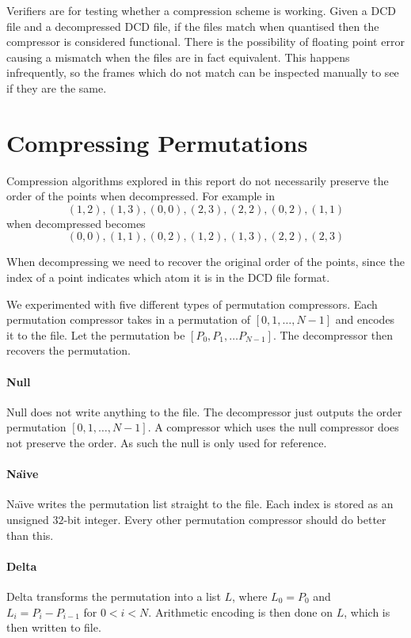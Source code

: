 \documentclass[a4paper]{report}
\begin{document}
Verifiers are for testing whether a compression scheme is working. Given a DCD
file and a decompressed DCD file, if the files match when quantised then the
compressor is considered functional. There is the possibility of floating
point error causing a mismatch when the files are in fact equivalent. This
happens infrequently, so the frames which do not match can be inspected
manually to see if they are the same.


\section{Compressing Permutations}
\label{sec:compr-perm}

Compression algorithms explored in this report do not necessarily preserve the
order of the points when decompressed. For example in \citet{devillers2000gci}
\[ (1, 2), (1, 3), (0, 0), (2, 3), (2, 2), (0, 2), (1, 1) \]
when decompressed becomes
\[ (0, 0), (1, 1), (0, 2), (1, 2), (1, 3), (2, 2), (2, 3) \]

When decompressing we need to recover the original order of the points, since
the index of a point indicates which atom it is in the DCD file format.

We experimented with five different types of permutation compressors. Each
permutation compressor takes in a permutation of $[0,1,\dots,N-1]$ and encodes
it to the file. Let the permutation be $[P_0, P_1, \dots P_{N-1}]$. The
decompressor then recovers the permutation.

\paragraph{Null}
Null does not write anything to the file. The decompressor just outputs the
order permutation $[0,1,\dots,N-1]$. A compressor which uses the null
compressor does not preserve the order. As such the null is only used for
reference.

\paragraph{Na\"{\i}ve}
Na\"{\i}ve writes the permutation list straight to the file. Each index is
stored as an unsigned $32$-bit integer. Every other permutation compressor
should do better than this.

\paragraph{Delta}
Delta transforms the permutation into a list $L$, where $L_0 = P_0$ and $L_i =
P_i - P_{i-1}$ for $0 < i < N$. Arithmetic encoding is then done on $L$, which
is then written to file.
\end{document}

